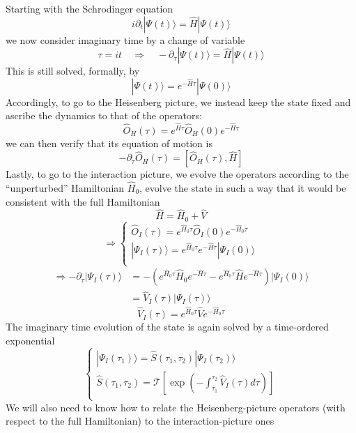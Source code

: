 Starting with the Schrodinger equation
\[ i\partial _t|\Psi \left( t \right) \rangle =\hat{H}|\Psi \left( t \right) \rangle \]
we now consider imaginary time by a change of variable
\[ \tau =it\quad \Rightarrow \quad -\partial _{\tau}|\Psi \left( t \right) \rangle =\hat{H}|\Psi \left( t \right) \rangle \]
This is still solved, formally, by
\[ |\Psi \left( t \right) \rangle =e^{-\hat{H}\tau}|\Psi \left( 0 \right) \rangle \]
Accordingly, to go to the Heisenberg picture, we instead keep the state fixed and ascribe the dynamics to that of the operators:
\[ \hat{O}_H\left( \tau \right) =e^{\hat{H}\tau}\hat{O}_H\left( 0 \right) e^{-\hat{H}\tau}\]
we can then verify that its equation of motion is
\[ -\partial _{\tau}\hat{O}_H\left( \tau \right) =\left[ \hat{O}_H\left( \tau \right) ,\hat{H} \right] \]
Lastly, to go to the interaction picture, we evolve the operators according to the ``unperturbed'' Hamiltonian $\hat{H}_0$, evolve the state in such a way that it would be consistent with the full Hamiltonian
\[ \hat{H}=\hat{H}_0+\hat{V}\]
\[ \Rightarrow \begin{cases}
	\hat{O}_I\left( \tau \right) =e^{\hat{H}_0\tau}\hat{O}_I\left( 0 \right) e^{-\hat{H}_0\tau}\\
	|\Psi _I\left( \tau \right) \rangle =e^{\hat{H}_0\tau}e^{-\hat{H}\tau}|\Psi _I\left( 0 \right) \rangle\\
\end{cases}\]
\begin{align*}
    \Rightarrow -\partial _{\tau}|\Psi _I\left( \tau \right) \rangle &=-\left( e^{\hat{H}_0\tau}\hat{H}_0e^{-\hat{H}\tau}-e^{\hat{H}_0\tau}\hat{H}e^{-\hat{H}\tau} \right) |\Psi _I\left( 0 \right) \rangle \\
    &=\hat{V}_I\left( \tau \right) |\Psi _I\left( \tau \right) \rangle
\end{align*}
\[ \hat{V}_I\left( \tau \right) =e^{\hat{H}_0\tau}\hat{V}e^{-\hat{H}_0\tau}\]
The imaginary time evolution of the state is again solved by a time-ordered exponential
\[ \begin{cases}
	|\Psi _I\left( \tau _1 \right) \rangle =\hat{S}\left( \tau _1,\tau _2 \right) |\Psi _I\left( \tau _2 \right) \rangle\\
	\hat{S}\left( \tau _1,\tau _2 \right) =\mathcal{T} \left[ \exp \left( -\int_{\tau _1}^{\tau _2}{\hat{V}_I\left( \tau \right) d\tau} \right) \right]\\
\end{cases}\]
We will also need to know how to relate the Heisenberg-picture operators (with respect to the full Hamiltonian) to the interaction-picture ones
